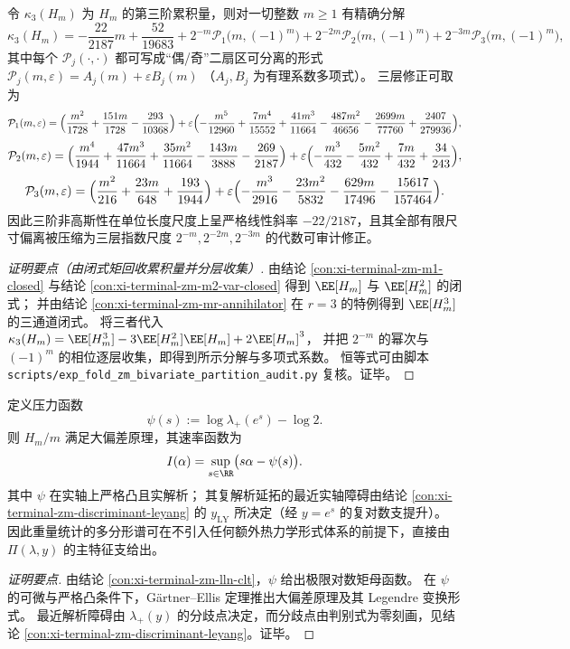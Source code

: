 \begin{conclusion}\label{con:xi-terminal-zm-kappa3-finite-closed}
令 \(\kappa_3(H_m)\) 为 \(H_m\) 的第三阶累积量，则对一切整数 \(m\ge 1\) 有精确分解
\[
\kappa_3(H_m)= -\frac{22}{2187}m+\frac{52}{19683}
+2^{-m}\mathcal P_1\!\bigl(m,(-1)^m\bigr)
+2^{-2m}\mathcal P_2\!\bigl(m,(-1)^m\bigr)
+2^{-3m}\mathcal P_3\!\bigl(m,(-1)^m\bigr),
\]
其中每个 \(\mathcal P_j(\cdot,\cdot)\) 都可写成“偶/奇”二扇区可分离的形式
\(
\mathcal P_j(m,\varepsilon)=A_j(m)+\varepsilon B_j(m)
\)
（\(A_j,B_j\) 为有理系数多项式）。
三层修正可取为
\[
\mathcal P_1(m,\varepsilon)=\Bigl(\frac{m^2}{1728}+\frac{151m}{1728}-\frac{293}{10368}\Bigr)
+\varepsilon\Bigl(-\frac{m^5}{12960}+\frac{7m^4}{15552}+\frac{41m^3}{11664}-\frac{487m^2}{46656}-\frac{2699m}{77760}+\frac{2407}{279936}\Bigr),
\]
\[
\mathcal P_2(m,\varepsilon)=\Bigl(\frac{m^4}{1944}+\frac{47m^3}{11664}+\frac{35m^2}{11664}-\frac{143m}{3888}-\frac{269}{2187}\Bigr)
+\varepsilon\Bigl(-\frac{m^3}{432}-\frac{5m^2}{432}+\frac{7m}{432}+\frac{34}{243}\Bigr),
\]
\[
\mathcal P_3(m,\varepsilon)=\Bigl(\frac{m^2}{216}+\frac{23m}{648}+\frac{193}{1944}\Bigr)
+\varepsilon\Bigl(-\frac{m^3}{2916}-\frac{23m^2}{5832}-\frac{629m}{17496}-\frac{15617}{157464}\Bigr).
\]
因此三阶非高斯性在单位长度尺度上呈严格线性斜率 \(-22/2187\)，且其全部有限尺寸偏离被压缩为三层指数尺度 \(2^{-m},2^{-2m},2^{-3m}\) 的代数可审计修正。
\end{conclusion}
\begin{proof}[证明要点（由闭式矩回收累积量并分层收集）]
由结论 \ref{con:xi-terminal-zm-m1-closed} 与结论 \ref{con:xi-terminal-zm-m2-var-closed} 得到 \(\EE[H_m]\) 与 \(\EE[H_m^2]\) 的闭式；
并由结论 \ref{con:xi-terminal-zm-mr-annihilator} 在 \(r=3\) 的特例得到 \(\EE[H_m^3]\) 的三通道闭式。
将三者代入
\(\kappa_3(H_m)=\EE[H_m^3]-3\EE[H_m^2]\EE[H_m]+2\EE[H_m]^3\)，
并把 \(2^{-m}\) 的幂次与 \((-1)^m\) 的相位逐层收集，即得到所示分解与多项式系数。
恒等式可由脚本 \texttt{scripts/exp\_fold\_zm\_bivariate\_partition\_audit.py} 复核。证毕。
\end{proof}

\begin{conclusion}\label{con:xi-terminal-zm-ldp}
定义压力函数
\[
\psi(s):=\log\lambda_+(e^s)-\log 2.
\]
则 \(H_m/m\) 满足大偏差原理，其速率函数为
\[
I(\alpha)=\sup_{s\in\RR}\bigl(s\alpha-\psi(s)\bigr).
\]
其中 \(\psi\) 在实轴上严格凸且实解析；
其复解析延拓的最近实轴障碍由结论 \ref{con:xi-terminal-zm-discriminant-leyang} 的 \(y_{\mathrm{LY}}\) 所决定（经 \(y=e^s\) 的复对数支提升）。
因此重量统计的多分形谱可在不引入任何额外热力学形式体系的前提下，直接由 \(\Pi(\lambda,y)\) 的主特征支给出。
\end{conclusion}
\begin{proof}[证明要点]
由结论 \ref{con:xi-terminal-zm-lln-clt}，\(\psi\) 给出极限对数矩母函数。
在 \(\psi\) 的可微与严格凸条件下，G\"artner--Ellis 定理推出大偏差原理及其 Legendre 变换形式。
最近解析障碍由 \(\lambda_+(y)\) 的分歧点决定，而分歧点由判别式为零刻画，见结论 \ref{con:xi-terminal-zm-discriminant-leyang}。证毕。
\end{proof}

